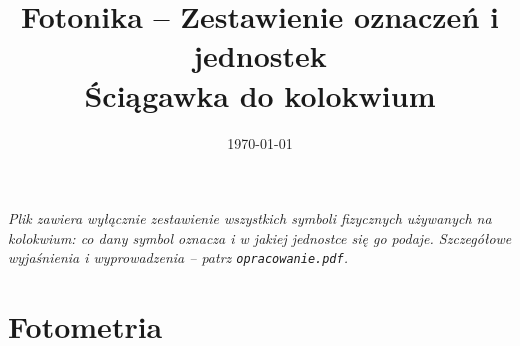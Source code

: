 \documentclass[12pt,a4paper]{article}
\title{\textbf{Fotonika -- Zestawienie oznaczeń i jednostek}\\[4pt]
       \large Ściągawka do kolokwium}
\author{}
\date{\today}
\begin{document}
\maketitle

\begin{center}
\textit{Plik zawiera wyłącznie zestawienie wszystkich symboli fizycznych
 używanych na kolokwium: co dany symbol oznacza i w jakiej jednostce się
 go podaje.  Szczegółowe wyjaśnienia i wyprowadzenia -- patrz \texttt{opracowanie.pdf}.}
\end{center}

\bigskip
\tableofcontents
\newpage

\section{Fotometria}
\end{document}
